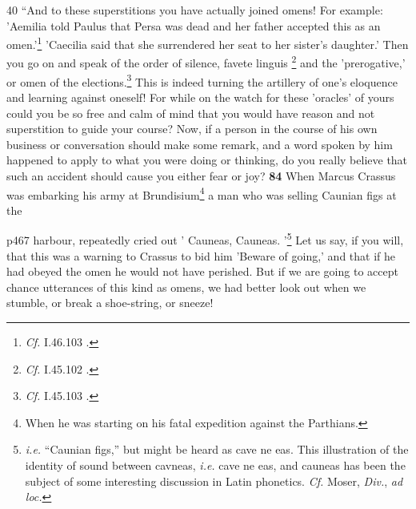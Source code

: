 40
``And to these superstitions you have actually joined omens! For example: 'Aemilia told Paulus that Persa was dead and her father accepted this as an omen.'\texthebrew{}\footnote{\emph{Cf.}
I.46.103 .

} 'Caecilia said that she surrendered her seat to her sister's daughter.' Then you go on and speak of the order of silence, favete linguis \texthebrew{}\footnote{\emph{Cf.}
I.45.102 .

} and the 'prerogative,' or omen of the elections.\texthebrew{}\footnote{\emph{Cf.}
I.45.103 .

} This is indeed turning the artillery of one's eloquence and learning against oneself! For while on the watch for these 'oracles' of yours could you be so free and calm of mind that you would have reason and not superstition to guide your course? Now, if a person in the course of his own business or conversation should make some remark, and a word spoken by him happened to apply to what you were doing or thinking, do you really believe that such an accident should cause you either fear or joy? \textbf{84} When Marcus Crassus was embarking his army at Brundisium\texthebrew{}\footnote{When he was starting on his fatal expedition against the Parthians.

} a man who was selling Caunian figs at the

p467 harbour, repeatedly cried out ' Cauneas, Cauneas. '\texthebrew{}\footnote{\emph{i.e.} ``Caunian figs,'' but might be heard as cave ne eas. This illustration of the identity of sound between cavneas, \emph{i.e.} cave ne eas, and cauneas has been the subject of some interesting discussion in Latin phonetics. \emph{Cf.} Moser, \emph{Div.}, \emph{ad loc.}

} Let us say, if you will, that this was a warning to Crassus to bid him 'Beware of going,' and that if he had obeyed the omen he would not have perished. But if we are going to accept chance utterances of this kind as omens, we had better look out when we stumble, or break a shoe-string, or sneeze!

